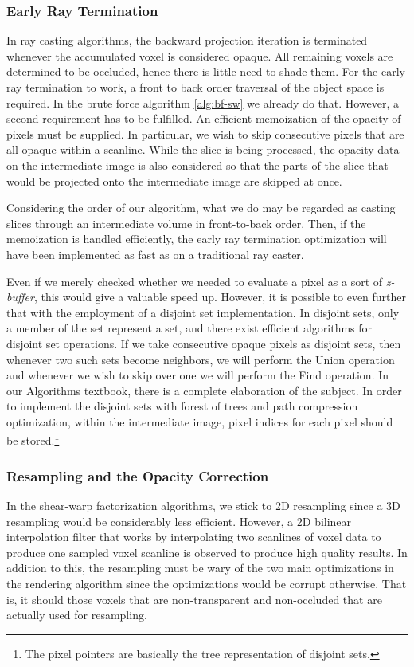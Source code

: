 \documentclass[a4paper,12pt]{article}
\begin{document}
\subsubsection{Early Ray Termination}
In ray casting algorithms, the backward projection iteration is
terminated whenever the accumulated voxel is considered opaque. All
remaining voxels are determined to be occluded, hence there is little
need to shade them. For the early ray termination to work, a front to
back order traversal of the object space is required. In the brute
force algorithm \ref{alg:bf-sw} we already do that. However, a second
requirement has to be fulfilled. An efficient memoization of the
opacity of pixels must be supplied. In particular, we wish to skip
consecutive pixels that are all opaque within a scanline.  While the
slice is being processed, the opacity data on the intermediate image
is also considered so that the parts of the slice that would be
projected onto the intermediate image are skipped at once.

Considering the order of our algorithm, what we do may be regarded as
casting slices through an intermediate volume in front-to-back order.
Then, if the memoization is handled efficiently, the early ray
termination optimization will have been implemented as fast as on a
traditional ray caster.

Even if we merely checked whether we needed to evaluate a pixel as a
sort of \emph{z-buffer}, this
would give a valuable speed up. However, it is possible to even
further that with the employment of a disjoint set implementation. In
disjoint sets, only a member of the set represent a set, and there
exist efficient algorithms for disjoint set operations. If we take
consecutive opaque pixels as disjoint sets, then whenever two such
sets become neighbors, we will perform the Union operation and
whenever we wish to skip over one we will perform the Find operation.
In our Algorithms textbook, there is a complete elaboration of the
subject. In order to implement the disjoint sets with forest of trees
and path compression optimization, within the intermediate image,
pixel indices for each pixel should be stored.\footnote{The pixel
  pointers are basically the tree representation of disjoint sets.}

\subsubsection{Resampling and the Opacity Correction}
In the shear-warp factorization algorithms, we stick to 2D resampling
since a 3D resampling would be considerably less efficient. However, a
2D bilinear interpolation filter that works by interpolating two
scanlines of voxel data to produce one sampled voxel scanline is
observed to produce high quality results. In addition to this, the
resampling must be wary of the two main optimizations in the rendering
algorithm since the optimizations would be corrupt otherwise. That is,
it should those voxels that are non-transparent and non-occluded that are
actually used for resampling.
\end{document}
